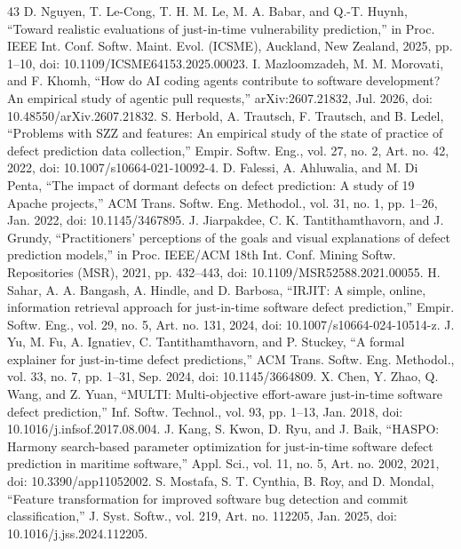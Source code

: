 \begin{thebibliography}{43}
 D. Nguyen, T. Le-Cong, T. H. M. Le, M. A. Babar, and Q.-T. Huynh, ``Toward realistic evaluations of just-in-time vulnerability prediction,'' in Proc. IEEE Int. Conf. Softw. Maint. Evol. (ICSME), Auckland, New Zealand, 2025, pp. 1--10, doi: \mbox{10.1109/ICSME64153.2025.00023}.
 I. Mazloomzadeh, M. M. Morovati, and F. Khomh, ``How do AI coding agents contribute to software development? An empirical study of agentic pull requests,'' arXiv:2607.21832, Jul. 2026, doi: \mbox{10.48550/arXiv.2607.21832}.
 S. Herbold, A. Trautsch, F. Trautsch, and B. Ledel, ``Problems with SZZ and features: An empirical study of the state of practice of defect prediction data collection,'' Empir. Softw. Eng., vol. 27, no. 2, Art. no. 42, 2022, doi: \mbox{10.1007/s10664-021-10092-4}.
 D. Falessi, A. Ahluwalia, and M. Di Penta, ``The impact of dormant defects on defect prediction: A study of 19 Apache projects,'' ACM Trans. Softw. Eng. Methodol., vol. 31, no. 1, pp. 1--26, Jan. 2022, doi: \mbox{10.1145/3467895}.
 J. Jiarpakdee, C. K. Tantithamthavorn, and J. Grundy, ``Practitioners' perceptions of the goals and visual explanations of defect prediction models,'' in Proc. IEEE/ACM 18th Int. Conf. Mining Softw. Repositories (MSR), 2021, pp. 432--443, doi: \mbox{10.1109/MSR52588.2021.00055}.
 H. Sahar, A. A. Bangash, A. Hindle, and D. Barbosa, ``IRJIT: A simple, online, information retrieval approach for just-in-time software defect prediction,'' Empir. Softw. Eng., vol. 29, no. 5, Art. no. 131, 2024, doi: \mbox{10.1007/s10664-024-10514-z}.
 J. Yu, M. Fu, A. Ignatiev, C. Tantithamthavorn, and P. Stuckey, ``A formal explainer for just-in-time defect predictions,'' ACM Trans. Softw. Eng. Methodol., vol. 33, no. 7, pp. 1--31, Sep. 2024, doi: \mbox{10.1145/3664809}.
 X. Chen, Y. Zhao, Q. Wang, and Z. Yuan, ``MULTI: Multi-objective effort-aware just-in-time software defect prediction,'' Inf. Softw. Technol., vol. 93, pp. 1--13, Jan. 2018, doi: \mbox{10.1016/j.infsof.2017.08.004}.
 J. Kang, S. Kwon, D. Ryu, and J. Baik, ``HASPO: Harmony search-based parameter optimization for just-in-time software defect prediction in maritime software,'' Appl. Sci., vol. 11, no. 5, Art. no. 2002, 2021, doi: \mbox{10.3390/app11052002}.
 S. Mostafa, S. T. Cynthia, B. Roy, and D. Mondal, ``Feature transformation for improved software bug detection and commit classification,'' J. Syst. Softw., vol. 219, Art. no. 112205, Jan. 2025, doi: \mbox{10.1016/j.jss.2024.112205}.

\end{thebibliography}
